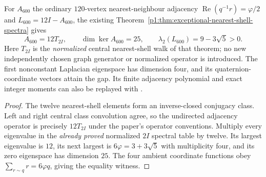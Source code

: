 \documentclass[11pt]{article}
\begin{document}
\begin{corollary}
\label{p1:cor:v3026-600-hs-spectral-gap}
For $A_{600}$ the ordinary $120$-vertex nearest-neighbour adjacency
$\operatorname{Re}(q^{-1}r)=\varphi/2$ and
$L_{600}=12I-A_{600}$, the existing
Theorem~\ref{p1:thm:exceptional-nearest-shell-spectra} gives
\[
\boxed{A_{600}=12T_{2I},\qquad
\dim\ker A_{600}=25,\qquad
\lambda_2(L_{600})=9-3\sqrt5>0.}
\]
Here $T_{2I}$ is the \emph{normalized} central nearest-shell walk of
that theorem; no new independently chosen graph generator or
normalized operator is introduced. The first nonconstant Laplacian
eigenspace has dimension four, and its quaternion-coordinate vectors
attain the gap. Its finite adjacency polynomial and exact integer
moments can also be replayed with
.
\end{corollary}
\begin{proof}
The twelve nearest-shell elements form an inverse-closed conjugacy
class. Left and right central class convolution agree, so the
undirected adjacency operator is precisely $12T_{2I}$ under the
paper's operator conventions. Multiply every eigenvalue in the
\emph{already proved} normalized $2I$ spectral table by twelve.
Its largest eigenvalue is $12$, its next largest is
$6\varphi=3+3\sqrt5$ with multiplicity four, and its zero
eigenspace has dimension $25$. The four ambient coordinate functions
obey $\sum_{r\sim q}r=6\varphi q$, giving the equality witness.
\end{proof}
\end{document}
